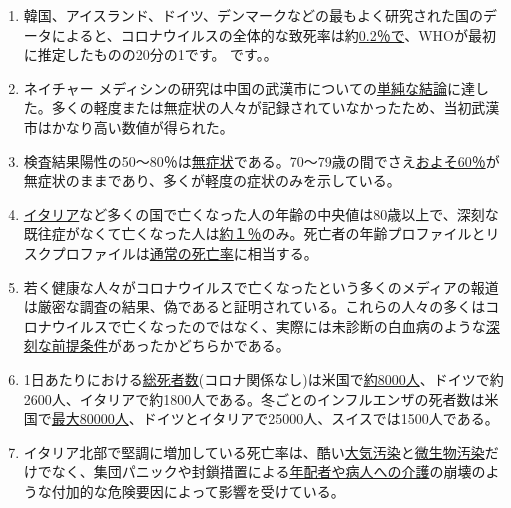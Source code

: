 \begin{enumerate}
\def\labelenumi{\arabic{enumi}.}
\tightlist
\item
  韓国、アイスランド、ドイツ、デンマークなどの最もよく研究された国のデータによると、コロナウイルスの全体的な致死率は約\href{https://swprs.org/studies-on-covid-19-lethality/}{0.2％で}、WHOが最初に推定したものの20分の1です。
  です。。
\item
  ネイチャー
  メディシンの研究は中国の武漢市についての\href{https://www.nature.com/articles/s41591-020-0822-7}{単純な結論}に達した。多くの軽度または無症状の人々が記録されていなかったため、当初武漢市はかなり高い数値が得られた。
\item
  検査結果陽性の50～80％は\href{https://www.bmj.com/content/369/bmj.m1375}{無症状}である。70～79歳の間でさえ\href{https://www.niid.go.jp/niid/en/2019-ncov-e/9407-covid-dp-fe-01.html}{およそ60％}が無症状のままであり、多くが軽度の症状のみを示している。
\item
  \href{https://www.epicentro.iss.it/coronavirus/sars-cov-2-decessi-italia}{イタリア}など多くの国で亡くなった人の年齢の中央値は80歳以上で、深刻な既往症がなくて亡くなった人は\href{https://www.bloomberg.com/news/articles/2020-03-18/99-of-those-who-died-from-virus-had-other-illness-italy-says}{約１％}のみ。死亡者の年齢プロファイルとリスクプロファイルは\href{https://www.vienna.at/analyse-zeigt-covid-19-opferkurve-entspricht-normaler-mortalitaet/6581246}{通常の死亡率}に相当する。
\item
  若く健康な人々がコロナウイルスで亡くなったという多くのメディアの報道は厳密な調査の結果、偽であると証明されている。これらの人々の多くはコロナウイルスで亡くなったのではなく、実際には未診断の白血病のような\href{https://sports.yahoo.com/spanish-football-coach-francisco-garcia-163153573.html}{深刻な前提条件}があったかどちらかである。
\item
  1日あたりにおける\href{https://www.euromomo.eu/index.html}{総死者数}(コロナ関係なし)は米国で\href{https://www.cdc.gov/mmwr/volumes/68/wr/mm6826a5.htm}{約8000人}、ドイツで約2600人、イタリアで約1800人である。冬ごとのインフルエンザの死者数は米国で\href{https://www.statnews.com/2018/09/26/cdc-us-flu-deaths-winter/}{最大80000人}、ドイツとイタリアで25000人、スイスでは1500人である。
\item
  イタリア北部で堅調に増加している死亡率は、酷い\href{https://www.heise.de/tp/features/Feinstaubpartikel-als-Viren-Vehikel-4687454.html}{大気汚染}と\href{https://www.apotheke-adhoc.de/nachrichten/detail/coronavirus/erhoehen-legionellen-die-todesrate-einer-corona-infektion/}{微生物汚染}だけでなく、集団パニックや封鎖措置による\href{https://www.sueddeutsche.de/politik/coronavirus-pflegekraefte-ausland-1.4866124}{年配者や病人への介護}の崩壊のような付加的な危険要因によって影響を受けている。

\end{enumerate}
